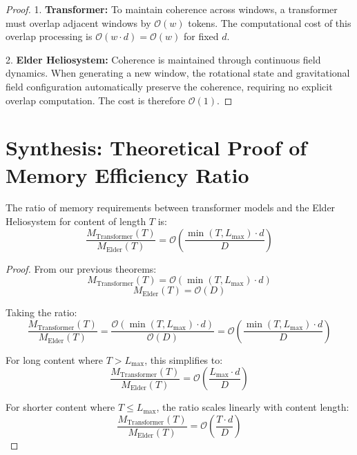 \begin{proof}
1. \textbf{Transformer:}
   To maintain coherence across windows, a transformer must overlap adjacent windows by $\mathcal{O}(w)$ tokens. The computational cost of this overlap processing is $\mathcal{O}(w \cdot d) = \mathcal{O}(w)$ for fixed $d$.

2. \textbf{Elder Heliosystem:}
   Coherence is maintained through continuous field dynamics. When generating a new window, the rotational state and gravitational field configuration automatically preserve the coherence, requiring no explicit overlap computation. The cost is therefore $\mathcal{O}(1)$.
\end{proof}

\section{Synthesis: Theoretical Proof of Memory Efficiency Ratio}

\begin{theorem}
The ratio of memory requirements between transformer models and the Elder Heliosystem for content of length $T$ is:
\begin{equation}
\frac{M_{\text{Transformer}}(T)}{M_{\text{Elder}}(T)} = \mathcal{O}\left(\frac{\min(T, L_{\max}) \cdot d}{D}\right)
\end{equation}
\end{theorem}

\begin{proof}
From our previous theorems:
\begin{equation}
M_{\text{Transformer}}(T) = \mathcal{O}(\min(T, L_{\max}) \cdot d)
\end{equation}
\begin{equation}
M_{\text{Elder}}(T) = \mathcal{O}(D)
\end{equation}

Taking the ratio:
\begin{equation}
\frac{M_{\text{Transformer}}(T)}{M_{\text{Elder}}(T)} = \frac{\mathcal{O}(\min(T, L_{\max}) \cdot d)}{\mathcal{O}(D)} = \mathcal{O}\left(\frac{\min(T, L_{\max}) \cdot d}{D}\right)
\end{equation}

For long content where $T > L_{\max}$, this simplifies to:
\begin{equation}
\frac{M_{\text{Transformer}}(T)}{M_{\text{Elder}}(T)} = \mathcal{O}\left(\frac{L_{\max} \cdot d}{D}\right)
\end{equation}

For shorter content where $T \leq L_{\max}$, the ratio scales linearly with content length:
\begin{equation}
\frac{M_{\text{Transformer}}(T)}{M_{\text{Elder}}(T)} = \mathcal{O}\left(\frac{T \cdot d}{D}\right)
\end{equation}
\end{proof}

